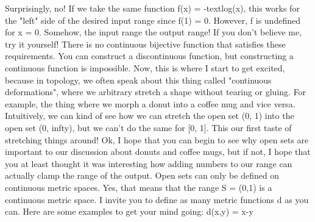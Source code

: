 {}Surprisingly, no! If we take the same function \markdownRendererDollarSign{}f(x) = -\markdownRendererBackslash{}text\markdownRendererLeftBrace{}log\markdownRendererRightBrace{}(x)\markdownRendererDollarSign{}, this works for the "left" side of the desired input range since \markdownRendererDollarSign{}f(1) = 0\markdownRendererDollarSign{}. However, \markdownRendererDollarSign{}f\markdownRendererDollarSign{} is undefined for \markdownRendererDollarSign{}x = 0\markdownRendererDollarSign{}. Somehow,  the input range  the output range!\markdownRendererParagraphSeparator
{}If you don't believe me, try it yourself! There is no continuous bijective function that satisfies these requirements. You can construct a discontinuous function, but constructing a continuous function is impossible.\markdownRendererParagraphSeparator
{}Now, this is where I start to get excited, because in topology, we often speak about this thing called "continuous deformations", where we arbitrary stretch a shape without tearing or gluing. For example, the thing where we morph a donut into a coffee mug and vice versa. Intuitively, we can kind of see how we can stretch the open set \markdownRendererDollarSign{}(0, 1)\markdownRendererDollarSign{} into the open set \markdownRendererDollarSign{}(0, \markdownRendererBackslash{}infty)\markdownRendererDollarSign{}, but we can't do the same for \markdownRendererDollarSign{}[0, 1]\markdownRendererDollarSign{}. This our first taste of stretching things around!\markdownRendererParagraphSeparator
{}Ok, I hope that you can begin to see why open sets are important to our discussion about donuts and coffee mugs, but if not, I hope that you at least thought it was interesting how adding numbers to our range can actually clamp the range of the output.\markdownRendererInterblockSeparator
{}
\markdownRendererSectionEnd \markdownRendererSectionBegin
{}\markdownRendererInterblockSeparator
{}Open sets can only be defined on continuous metric spaces. Yes, that means that the range \markdownRendererDollarSign{}S = (0,1)\markdownRendererDollarSign{} is a continuous metric space.\markdownRendererInterblockSeparator
{}\markdownRendererBlockQuoteBegin
I invite you to define as many metric functions \markdownRendererDollarSign{}d\markdownRendererDollarSign{} as you can.\markdownRendererSoftLineBreak
{}Here are some examples to get your mind going:\markdownRendererInterblockSeparator
{}\markdownRendererOlBeginTight
{}\markdownRendererDollarSign{}d(x,y) = \markdownRendererPipe{}x-y\markdownRendererPipe{}\markdownRendererDollarSign{}\markdownRendererOlItemEnd 

